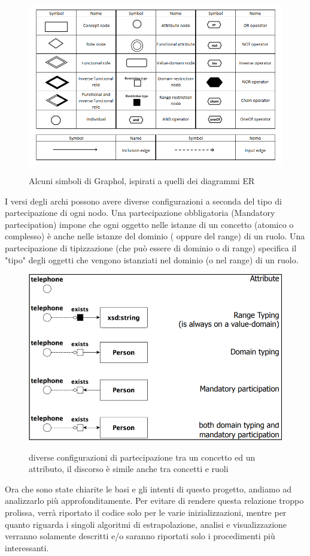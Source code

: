 \documentclass[Lau,binding=0.6cm]{sapthesis}
\begin{document}
\begin{figure}[H]
\centering
\includegraphics[width=1\textwidth]{final}\\[3ex]
\caption{Alcuni simboli di Graphol, ispirati a quelli dei diagrammi ER}
\label{fig:largenenough}
\end{figure}
I versi degli archi possono avere diverse configurazioni a seconda del tipo di partecipazione di ogni nodo.
Una partecipazione obbligatoria (Mandatory partecipation) impone che ogni oggetto nelle istanze di un concetto (atomico o complesso) è anche nelle istanze del dominio ( oppure del range) di un ruolo. Una partecipazione di tipizzazione (che può essere di dominio o di range) specifica il "tipo" degli oggetti che vengono istanziati nel dominio (o nel range) di un ruolo.
\begin{figure}[H]
\centering
\includegraphics[width=1\textwidth]{mandeopt}\\[3ex]
\caption{diverse configurazioni di partecipazione tra un concetto ed un attributo, il discorso è simile anche tra concetti e ruoli}
\label{fig:largenenough}
\end{figure}
Ora che sono state chiarite le basi e gli intenti di questo progetto, andiamo ad analizzarlo più approfonditamente. Per evitare di rendere questa relazione troppo prolissa, verrà riportato il codice solo per le varie inizializzazioni, mentre per quanto riguarda i singoli algoritmi di estrapolazione, analisi e visualizzazione verranno solamente descritti e/o saranno riportati solo i procedimenti più interessanti.
\end{document}
